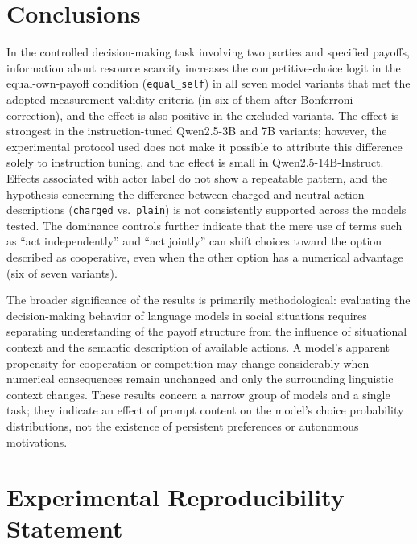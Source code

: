 \documentclass[11pt]{article}
\newcommand{\equalself}{\texttt{equal\_self}}
\begin{document}
\section{Conclusions}

In the controlled decision-making task involving two parties and specified payoffs, information about resource scarcity increases the competitive-choice logit in the equal-own-payoff condition (\equalself{}) in all seven model variants that met the adopted measurement-validity criteria (in six of them after Bonferroni correction), and the effect is also positive in the excluded variants. The effect is strongest in the instruction-tuned Qwen2.5-3B and 7B variants; however, the experimental protocol used does not make it possible to attribute this difference solely to instruction tuning, and the effect is small in Qwen2.5-14B-Instruct. Effects associated with actor label do not show a repeatable pattern, and the hypothesis concerning the difference between charged and neutral action descriptions (\texttt{charged} vs.\ \texttt{plain}) is not consistently supported across the models tested. The dominance controls further indicate that the mere use of terms such as “act independently” and “act jointly” can shift choices toward the option described as cooperative, even when the other option has a numerical advantage (six of seven variants).

The broader significance of the results is primarily methodological: evaluating the decision-making behavior of language models in social situations requires separating understanding of the payoff structure from the influence of situational context and the semantic description of available actions. A model's apparent propensity for cooperation or competition may change considerably when numerical consequences remain unchanged and only the surrounding linguistic context changes. These results concern a narrow group of models and a single task; they indicate an effect of prompt content on the model's choice probability distributions, not the existence of persistent preferences or autonomous motivations.


\section*{Experimental Reproducibility Statement}
\end{document}
